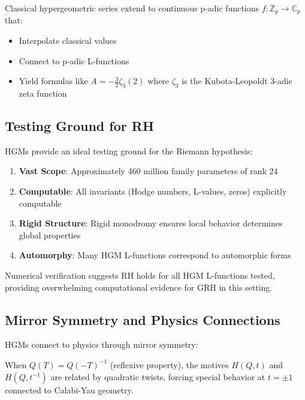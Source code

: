 \begin{theorem}
\label{thm:padic_hgm}
Classical hypergeometric series extend to continuous p-adic functions $f: \mathbb{Z}_p \to \mathbb{C}_p$ that:
\begin{itemize}
\item Interpolate classical values
\item Connect to p-adic L-functions
\item Yield formulas like $A = -\frac{3}{2}\zeta_3(2)$ where $\zeta_3$ is the Kubota-Leopoldt 3-adic zeta function
\end{itemize}
\end{theorem}

\subsection{Testing Ground for RH}

HGMs provide an ideal testing ground for the Riemann hypothesis:

\begin{enumerate}
\item \textbf{Vast Scope}: Approximately 460 million family parameters of rank 24
\item \textbf{Computable}: All invariants (Hodge numbers, L-values, zeros) explicitly computable
\item \textbf{Rigid Structure}: Rigid monodromy ensures local behavior determines global properties
\item \textbf{Automorphy}: Many HGM L-functions correspond to automorphic forms
\end{enumerate}

\begin{remark}
Numerical verification suggests RH holds for all HGM L-functions tested, providing overwhelming computational evidence for GRH in this setting.
\end{remark}

\subsection{Mirror Symmetry and Physics Connections}

HGMs connect to physics through mirror symmetry:

\begin{theorem}
\label{thm:reflexive_hgm}
When $Q(T) = Q(-T)^{-1}$ (reflexive property), the motives $H(Q,t)$ and $H(Q,t^{-1})$ are related by quadratic twists, forcing special behavior at $t = \pm 1$ connected to Calabi-Yau geometry.
\end{theorem}


